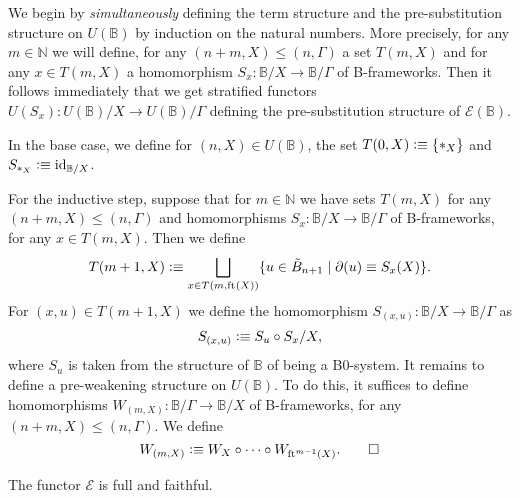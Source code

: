 \begin{constr}
We begin by \emph{simultaneously} defining the term structure and the pre-substitution
structure on $U(\mathbb{B})$ by induction on the natural numbers. More precisely,
for any $m\in\mathbb{N}$ we will define, for any $(n+m,X)\leq (n,\Gamma)$ a set
$T(m,X)$ and for any $x\in T(m,X)$ a homomorphism 
$S_x:\mathbb{B}/X\to\mathbb{B}/\Gamma$ of B-frameworks. Then it follows
immediately that we get stratified functors $U(S_x):U(\mathbb{B})/X\to U(\mathbb{B})/\Gamma$
defining the pre-substitution structure of $\mathcal{E}(\mathbb{B})$.

In the base case, we define for $(n,X)\in U(\mathbb{B})$, the set
$T(0,X)\defeq \{\pt[X]\}$ and $S_{\pt[X]}\defeq \catid{\mathbb{B}/X}$. 


For the inductive step, suppose that for $m\in\mathbb{N}$ we have sets $T(m,X)$
for any $(n+m,X)\leq (n,\Gamma)$ and homomorphisms $S_x:\mathbb{B}/X \to \mathbb{B}/\Gamma$
of B-frameworks, for any $x\in T(m,X)$. Then we define
\begin{equation*}
T(m+1,X)\vcentcolon\equiv\bigsqcup_{x\in T(m,\mathrm{ft}_{}(X))} \{u\in \tilde{B}_{n+1}\mid \partial_{}(u)\equiv S_x(X)\}.
\end{equation*}
For $(x,u)\in T(m+1,X)$ we define the homomorphism $S_{(x,u)}:\mathbb{B}/X\to
\mathbb{B}/\Gamma$ as
\begin{equation*}
S_{(x,u)}\vcentcolon\equiv S_u\circ S_x/X,
\end{equation*}
where $S_u$ is taken from the structure of $\mathbb{B}$ of being a B0-system.
It remains to define a pre-weakening structure on $U(\mathbb{B})$. To do this,
it suffices to define homomorphisms $W_{(m,X)}:\mathbb{B}/\Gamma \to\mathbb{B}/X$
of B-frameworks, for any $(n+m,X)\leq (n,\Gamma)$. We define
\begin{equation*}
W_{(m,X)}\vcentcolon\equiv W_X\circ\cdots\circ W_{\mathrm{ft}_{}^{m-1}(X)}.\qedhere
\end{equation*}
\end{constr}

\begin{thm}
The functor $\mathcal{E}$ is full and faithful.
\end{thm}

